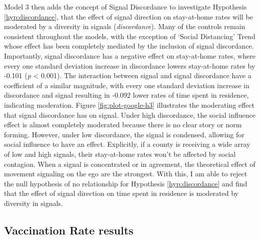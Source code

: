 Model 3 then adds the concept of Signal Discordance to investigate Hypothesis
\ref{hyp:discordance}, that the effect of signal direction on stay-at-home rates
will be moderated by a diversity in signals (\emph{discordance}). Many of the
controls remain consistent throughout the models, with the exception of `Social
Distancing' Trend whose effect has been completely mediated by the inclusion of
signal discordance. Importantly, signal discordance has a negative effect on
stay-at-home rates, where every one standard deviation increase in discordance
lowers stay-at-home rates by -0.101 (\emph{p} \textless{} 0.001). The
interaction between signal and signal discordance have a coefficient of a
similar magnitude, with every one standard deviation increase in discordance and
signal resulting in -0.092 lower rates of time spent in residence, indicating
moderation. Figure \ref{fig:plot-google-h3} illustrates the moderating effect
that signal discordance has on signal. Under high discordance, the social
influence effect is almost completely moderated because there is no clear story
or norm forming. However, under low discordance, the signal is condensed,
allowing for social influence to have an effect. Explicitly, if a county is
receiving a wide array of low and high signals, their stay-at-home rates won't
be affected by social contagion. When a signal is concentrated or in agreement,
the theoretical effect of movement signaling on the ego are the strongest. With
this, I am able to reject the null hypothesis of no relationship for Hypothesis
\ref{hyp:discordance} and find that the effect of signal direction on time spent
in residence is moderated by diversity in signals.

\hypertarget{vaccination-rate-results}{%
\subsection{Vaccination Rate results}\label{vaccination-rate-results}}



